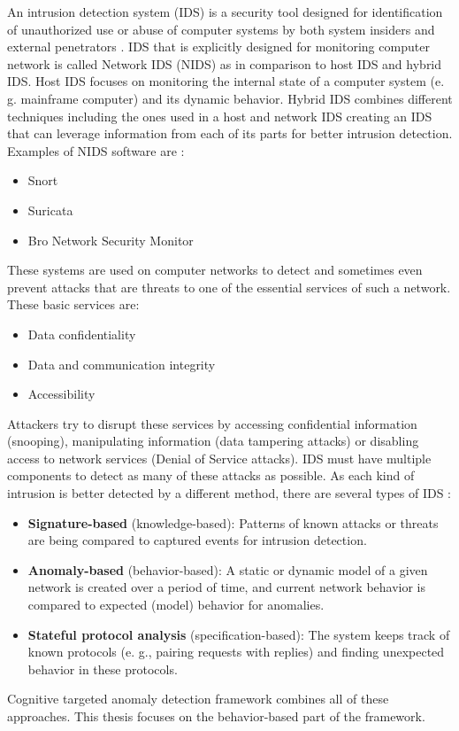 \documentclass[thesis=B,english]{FITthesis}[2012/10/20]
\begin{document}
An intrusion detection system (IDS) is a security tool designed for identification of unauthorized use or abuse of computer systems by both system insiders and external penetrators \cite{mukherjee1994network}.
IDS that is explicitly designed for monitoring computer network is called Network IDS (NIDS) as in comparison to host IDS and hybrid IDS.
Host IDS focuses on monitoring the internal state of a computer system (e. g. mainframe computer) and its dynamic behavior.
Hybrid IDS combines different techniques including the ones used in a host and network IDS creating an IDS that can leverage information from each of its parts for better intrusion detection.
Examples of NIDS software are \cite{cooper2019bestids} :
\begin{itemize}
    \item Snort
    \item Suricata
    \item Bro Network Security Monitor
\end{itemize}
These systems are used on computer networks to detect and sometimes even prevent attacks that are threats to one of the essential services of such a network.
These basic services are\cite{mukherjee1994network}:
\begin{itemize}
    \item Data confidentiality
    \item Data and communication integrity
    \item Accessibility
\end{itemize}
Attackers try to disrupt these services by accessing confidential information (snooping), manipulating information (data tampering attacks) or disabling access to network services (Denial of Service attacks).
IDS must have multiple components to detect as many of these attacks as possible.
As each kind of intrusion is better detected by a different method, there are several types of IDS \cite{liao2013intrusion}:
\begin{itemize}
    \item \textbf{Signature-based} (knowledge-based): Patterns of known attacks or threats are being compared to captured events for intrusion detection.
    \item \textbf{Anomaly-based} (behavior-based): A static or dynamic model of a given network is created over a period of time, and current network behavior is compared to expected (model) behavior for anomalies.
    \item \textbf{Stateful protocol analysis} (specification-based): The system keeps track of known protocols (e. g., pairing requests with replies) and finding unexpected behavior in these protocols.
\end{itemize}
Cognitive targeted anomaly detection framework combines all of these approaches.
This thesis focuses on the behavior-based part of the framework.
\end{document}
